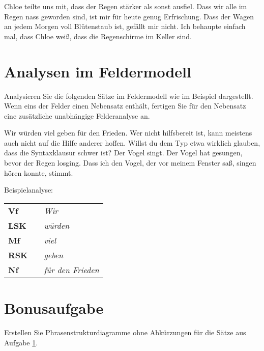\documentclass[12pt,a4paper,twoside]{article}
\newcommand{\Zeile}{\vspace{\baselineskip}}
\begin{document}
\begin{exe}
\setcounter{xnumi}{0}
  \ex Chloe teilte uns mit, dass der Regen stärker als sonst ausfiel.
  \ex Dass wir alle im Regen nass geworden sind, ist mir für heute genug Erfrischung.
  \ex Dass der Wagen an jedem Morgen voll Blütenstaub ist, gefällt mir nicht.
  \ex Ich behaupte einfach mal, dass Chloe weiß, dass die Regenschirme im Keller sind.
\end{exe}

\section{Analysen im Feldermodell}\label{sec:felder}

Analysieren Sie die folgenden Sätze im Feldermodell wie im Beispiel dargestellt.
Wenn eins der Felder einen Nebensatz enthält, fertigen Sie für den Nebensatz eine zusätzliche unabhängige Felderanalyse an.

\begin{exe}
\setcounter{xnumi}{0}
  \ex Wir würden viel geben für den Frieden.
  \ex Wer nicht hilfsbereit ist, kann meistens auch nicht auf die Hilfe anderer hoffen.
  \ex Willst du dem Typ etwa wirklich glauben, dass die Syntaxklausur schwer ist?
  \ex Der Vogel singt.
  \ex Der Vogel hat gesungen, bevor der Regen losging.
  \ex Dass ich den Vogel, der vor meinem Fenster saß, singen hören konnte, stimmt.
\end{exe}

Beispielanalyse:

\Zeile

\begin{tabular}[h]{lp{1em}l}
  \textbf{Vf}  && \textit{Wir} \\
  \textbf{LSK} && \textit{würden} \\
  \textbf{Mf}  && \textit{viel} \\
  \textbf{RSK} && \textit{geben} \\
  \textbf{Nf}  && \textit{für den Frieden} \\
\end{tabular}

\section{Bonusaufgabe}

Erstellen Sie Phrasenstrukturdiagramme ohne Abkürzungen für die Sätze aus Aufgabe \ref{sec:felder}.

\newpage
\ \\
\newpage
\ \\
\newpage
\ \\
\end{document}
